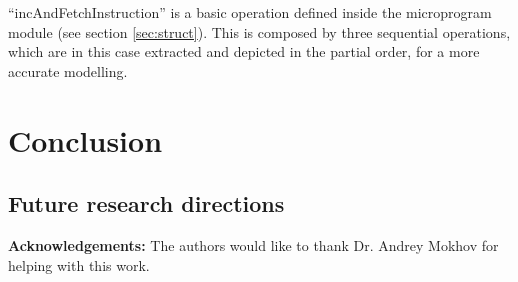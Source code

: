 \documentclass[conference]{IEEEtran}
\begin{document}
\noindent
``incAndFetchInstruction'' is a basic operation defined inside the microprogram module (see
section \ref{sec:struct}). This is composed by three sequential operations, which are in this
case extracted and depicted in the partial order, for a more accurate modelling.


\section{Conclusion}
\label{sec:conclusion}

\subsection{Future research directions}
\label{sec:frd}

\noindent\textbf{Acknowledgements:} The authors would like to thank Dr. Andrey Mokhov for
helping with this work.

\end{document}

